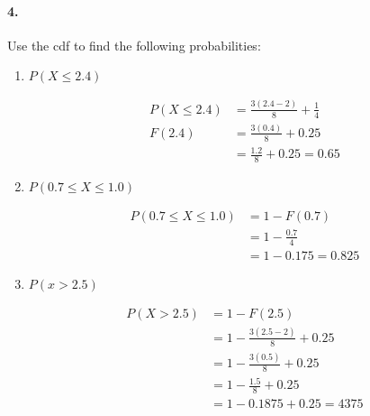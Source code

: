     \pagebreak

    \paragraph*{4.}
    Use the cdf to find the following probabilities:

    \begin{enumerate}[label=(\alph*)]
        \item $P(X \leq 2.4)$
        \\
        \begin{mdframed}
            \begin{align*}
                P(X \leq 2.4)   & = \frac{3(2.4-2)}{8} + \frac{1}{4}    \\
                F(2.4)          & = \frac{3(0.4)}{8} + 0.25             \\
                                & = \frac{1.2}{8} + 0.25 = \boxed{0.65}
            \end{align*}    
        \end{mdframed}
        
        \item $P(0.7 \leq X \leq 1.0)$
        \\
        \begin{mdframed}
            \begin{align*}
                P(0.7 \leq X \leq 1.0)  & = 1 - F(0.7)          \\
                                        & = 1 - \frac{0.7}{4}   \\
                                        & = 1 - 0.175 = \boxed{0.825}
            \end{align*}    
        \end{mdframed}
        
        \item $P(x > 2.5)$
        \\
        \begin{mdframed}
            \begin{align*}
                P(X > 2.5)  & = 1 - F(2.5)                      \\
                            & = 1 - \frac{3(2.5-2)}{8} + 0.25   \\
                            & = 1 - \frac{3(0.5)}{8} + 0.25     \\
                            & = 1 - \frac{1.5}{8} + 0.25        \\
                            & = 1 - 0.1875 + 0.25 = \boxed{4375}
            \end{align*}    
        \end{mdframed}
        

\end{enumerate}
